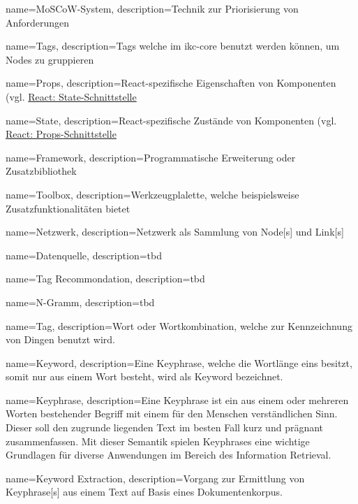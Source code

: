 {
    name=MoSCoW-System,
    description={Technik zur Priorisierung von Anforderungen}
    \cite{moscow:hardvard}
}

{
    name=Tags,
    description={Tags welche im \gls{ikc-core} benutzt werden können, um Nodes zu gruppieren}
}

{
    name=Props,
    description={React-spezifische Eigenschaften von Komponenten (vgl. \hyperref[props]{React: State-Schnittstelle}}
}

{
    name=State,
    description={React-spezifische Zustände von Komponenten (vgl. \hyperref[props]{React: Props-Schnittstelle}}
}

{
    name=Framework,
    description={Programmatische Erweiterung oder Zusatzbibliothek}
}

{
    name=Toolbox,
    description={Werkzeugplalette, welche beispielsweise Zu\-satz\-funk\-tio\-na\-li\-tät\-en bietet}
}

{
    name=Netzwerk,
    description={Netzwerk als Sammlung von \gls{Node}[s] und \gls{Link}[s]}
}

{
    name=Datenquelle,
    description={tbd}
}

{
    name=Tag Recommondation,
    description={tbd}
}

{
    name=N-Gramm,
    description={tbd}
}

{
    name=Tag,
    description={Wort oder Wortkombination, welche zur Kennzeichnung von Dingen benutzt wird.}
}

{
    name=Keyword,
    description={Eine \gls{Keyphrase}, welche die Wortlänge eins besitzt, somit nur aus einem Wort besteht, wird als Keyword bezeichnet.}
}

{
    name=Keyphrase,
    description={Eine Keyphrase ist ein aus einem oder mehreren Worten bestehender Begriff mit einem für den Menschen verständlichen Sinn. Dieser soll den zugrunde liegenden Text im besten Fall kurz und prägnant zusammenfassen. Mit dieser Semantik  spielen Keyphrases eine wichtige Grundlagen für diverse Anwendungen im Bereich des Information Retrieval.}
}

{
    name=Keyword Extraction,
    description={Vorgang zur Ermittlung von \gls{Keyphrase}[s] aus einem Text auf Basis eines Dokumentenkorpus.}
}

